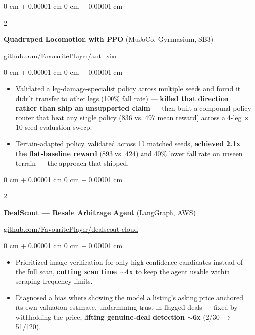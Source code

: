 \documentclass[10pt, letterpaper]{article}
\newenvironment{highlights}{
    \begin{itemize}[
        topsep=0.3 cm,
        parsep=0.075 cm,
        partopsep=0pt,
        itemsep=0.035 cm,
        leftmargin=0 cm + 10pt
    ]
}{
    \end{itemize}
} %
\newenvironment{onecolentry}{
    \begin{adjustwidth}{
        0 cm + 0.00001 cm
    }{
        0 cm + 0.00001 cm
    }
}{
    \end{adjustwidth}
} %
\newenvironment{extendedtwocolentry}[2][]{
    \onecolentry
    \def\secondColumn{#2}
    \setcolumnwidth{\fill, 8 cm}
    \begin{paracol}{2}
}{
    \switchcolumn \raggedleft \secondColumn
    \end{paracol}
    \endonecolentry
}
\begin{document}
        \begin{extendedtwocolentry}{
            \href{https://github.com/FavouritePlayer/ant_sim}{github.com/FavouritePlayer/ant\_sim}
        }
            \textbf{Quadruped Locomotion with PPO} (MuJoCo, Gymnasium, SB3)
        \end{extendedtwocolentry}

        \vspace{0.19 cm}
        \begin{onecolentry}
            \begin{highlights}
                \item Validated a leg-damage-specialist policy across multiple seeds and found it didn't transfer to other legs (100\% fall rate) — \textbf{killed that direction rather than ship an unsupported claim} — then built a compound policy router that beat any single policy (836 vs. 497 mean reward) across a 4-leg $\times$ 10-seed evaluation sweep.
                \item Terrain-adapted policy, validated across 10 matched seeds, \textbf{achieved 2.1x the flat-baseline reward} (893 vs. 424) and 40\% lower fall rate on unseen terrain — the approach that shipped.
            \end{highlights}
        \end{onecolentry}

        \begin{extendedtwocolentry}{
            \href{https://github.com/FavouritePlayer/dealscout-cloud}{github.com/FavouritePlayer/dealscout-cloud}
        }
            \textbf{DealScout — Resale Arbitrage Agent} (LangGraph, AWS)
        \end{extendedtwocolentry}

        \vspace{0.19 cm}
        \begin{onecolentry}
            \begin{highlights}
                \item Prioritized image verification for only high-confidence candidates instead of the full scan, \textbf{cutting scan time $\sim$4x} to keep the agent usable within scraping-frequency limits.
                \item Diagnosed a bias where showing the model a listing's asking price anchored its own valuation estimate, undermining trust in flagged deals — fixed by withholding the price, \textbf{lifting genuine-deal detection $\sim$6x} (2/30 $\rightarrow$ 51/120).
            \end{highlights}
        \end{onecolentry}
\end{document}
